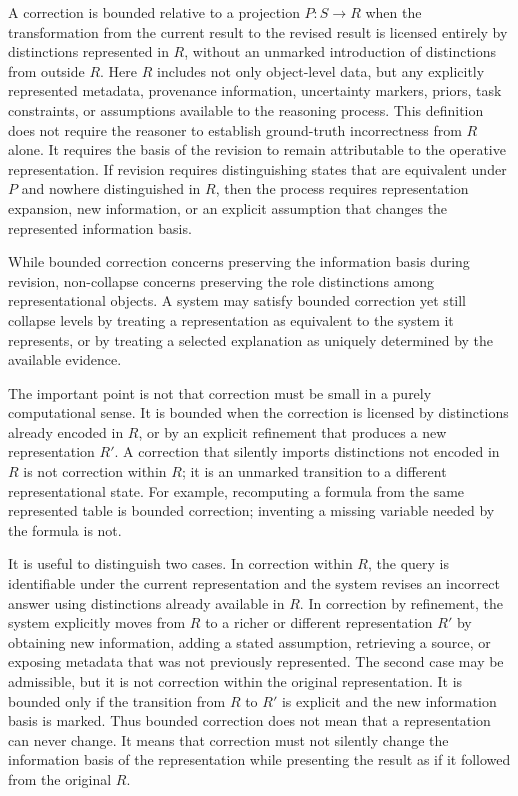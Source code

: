 \documentclass[11pt]{article}
\theoremstyle{definition}
\theoremstyle{remark}
\begin{document}
A correction is bounded relative to a projection \(P:S\rightarrow R\) when the transformation from the current result to the revised result is licensed entirely by distinctions represented in \(R\), without an unmarked introduction of distinctions from outside \(R\). Here \(R\) includes not only object-level data, but any explicitly represented metadata, provenance information, uncertainty markers, priors, task constraints, or assumptions available to the reasoning process. This definition does not require the reasoner to establish ground-truth incorrectness from \(R\) alone. It requires the basis of the revision to remain attributable to the operative representation. If revision requires distinguishing states that are equivalent under \(P\) and nowhere distinguished in \(R\), then the process requires representation expansion, new information, or an explicit assumption that changes the represented information basis.

While bounded correction concerns preserving the information basis during revision, non-collapse concerns preserving the role distinctions among representational objects. A system may satisfy bounded correction yet still collapse levels by treating a representation as equivalent to the system it represents, or by treating a selected explanation as uniquely determined by the available evidence.

The important point is not that correction must be small in a purely computational sense. It is bounded when the correction is licensed by distinctions already encoded in $R$, or by an explicit refinement that produces a new representation $R'$. A correction that silently imports distinctions not encoded in $R$ is not correction within $R$; it is an unmarked transition to a different representational state. For example, recomputing a formula from the same represented table is bounded correction; inventing a missing variable needed by the formula is not.

It is useful to distinguish two cases. In correction within $R$, the query is identifiable under the current representation and the system revises an incorrect answer using distinctions already available in $R$. In correction by refinement, the system explicitly moves from $R$ to a richer or different representation $R'$ by obtaining new information, adding a stated assumption, retrieving a source, or exposing metadata that was not previously represented. The second case may be admissible, but it is not correction within the original representation. It is bounded only if the transition from $R$ to $R'$ is explicit and the new information basis is marked. Thus bounded correction does not mean that a representation can never change. It means that correction must not silently change the information basis of the representation while presenting the result as if it followed from the original $R$.
\end{document}
